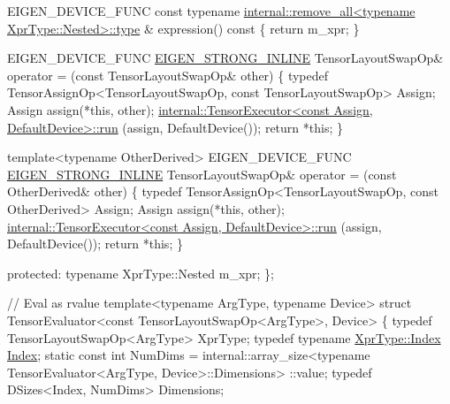 \begin{DoxyCodeInclude}
    EIGEN\_DEVICE\_FUNC
    \textcolor{keyword}{const} \textcolor{keyword}{typename} \hyperlink{struct_eigen_1_1internal_1_1remove__all_a5779acf852f62735a7d293d29b18e321}{internal::remove\_all<typename XprType::Nested>::type}
      &
    expression()\textcolor{keyword}{ const }\{ \textcolor{keywordflow}{return} m\_xpr; \}

    EIGEN\_DEVICE\_FUNC
    \hyperlink{eigen_2_eigen_2src_2_core_2util_2_macros_8h_af2b60117c00a6e75812de43bfe7db3b1}{EIGEN\_STRONG\_INLINE} TensorLayoutSwapOp& operator = (\textcolor{keyword}{const} TensorLayoutSwapOp& other)
    \{
      \textcolor{keyword}{typedef} TensorAssignOp<TensorLayoutSwapOp, const TensorLayoutSwapOp> Assign;
      Assign assign(*\textcolor{keyword}{this}, other);
      \hyperlink{class_eigen_1_1internal_1_1_tensor_executor_a2746f3ea9258215fe221288ec352c0bc}{internal::TensorExecutor<const Assign, DefaultDevice>::run}
      (assign, DefaultDevice());
      \textcolor{keywordflow}{return} *\textcolor{keyword}{this};
    \}

    \textcolor{keyword}{template}<\textcolor{keyword}{typename} OtherDerived>
    EIGEN\_DEVICE\_FUNC
    \hyperlink{eigen_2_eigen_2src_2_core_2util_2_macros_8h_af2b60117c00a6e75812de43bfe7db3b1}{EIGEN\_STRONG\_INLINE} TensorLayoutSwapOp& operator = (\textcolor{keyword}{const} OtherDerived& other)
    \{
      \textcolor{keyword}{typedef} TensorAssignOp<TensorLayoutSwapOp, const OtherDerived> Assign;
      Assign assign(*\textcolor{keyword}{this}, other);
      \hyperlink{class_eigen_1_1internal_1_1_tensor_executor_a2746f3ea9258215fe221288ec352c0bc}{internal::TensorExecutor<const Assign, DefaultDevice>::run}
      (assign, DefaultDevice());
      \textcolor{keywordflow}{return} *\textcolor{keyword}{this};
    \}

  \textcolor{keyword}{protected}:
    \textcolor{keyword}{typename} XprType::Nested m\_xpr;
\};


\textcolor{comment}{// Eval as rvalue}
\textcolor{keyword}{template}<\textcolor{keyword}{typename} ArgType, \textcolor{keyword}{typename} Device>
\textcolor{keyword}{struct }TensorEvaluator<const TensorLayoutSwapOp<ArgType>, Device>
\{
  \textcolor{keyword}{typedef} TensorLayoutSwapOp<ArgType> XprType;
  \textcolor{keyword}{typedef} \textcolor{keyword}{typename} \hyperlink{namespace_eigen_a62e77e0933482dafde8fe197d9a2cfde}{XprType::Index} \hyperlink{namespace_eigen_a62e77e0933482dafde8fe197d9a2cfde}{Index};
  \textcolor{keyword}{static} \textcolor{keyword}{const} \textcolor{keywordtype}{int} NumDims = internal::array\_size<typename TensorEvaluator<ArgType, Device>::Dimensions>
      ::value;
  \textcolor{keyword}{typedef} DSizes<Index, NumDims> Dimensions;


\end{DoxyCodeInclude}
